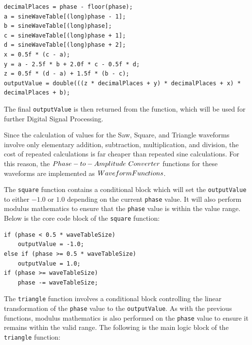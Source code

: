 \documentclass[a4paper,12pt]{report}
\begin{document}
 \noindent\begin{minipage}{\linewidth} \begin{lstlisting}[caption={4-Point Polynomial Interpolation implementation},label={code:4ptpolyinterpolation},captionpos=b]
decimalPlaces = phase - floor(phase);
a = sineWaveTable[(long)phase - 1];
b = sineWaveTable[(long)phase];
c = sineWaveTable[(long)phase + 1];
d = sineWaveTable[(long)phase + 2];
x = 0.5f * (c - a);
y = a - 2.5f * b + 2.0f * c - 0.5f * d;
z = 0.5f * (d - a) + 1.5f * (b - c);
outputValue = double(((z * decimalPlaces + y) * decimalPlaces + x) * decimalPlaces + b);
\end{lstlisting} \end{minipage}

The final \texttt{output\-Value} is then returned from the function, which will be used for further Digital Signal Processing.

Since the calculation of values for the Saw, Square, and Triangle waveforms involve only elementary addition, subtraction, multiplication, and division, the cost of repeated calculations is far cheaper than repeated sine calculations. For this reason, the $Phase-to-Amplitude\ \-Converter$ functions for these waveforms are implemented as $Waveform \-Functions$.

The \texttt{square} function contains a conditional block which will set the \texttt{output\-Value} to either $-1.0$ or $1.0$ depending on the current \texttt{phase} value. It will also perform modulus mathematics to ensure that the \texttt{phase} value is within the value range. Below is the core code block of the \texttt{square} function:

 \noindent\begin{minipage}{\linewidth} \begin{lstlisting}[caption={The \texttt{square()} waveform function},label={code:square},captionpos=b]
if (phase < 0.5 * waveTableSize)
    outputValue = -1.0;
else if (phase >= 0.5 * waveTableSize)
    outputValue = 1.0;
if (phase >= waveTableSize)
    phase -= waveTableSize;
\end{lstlisting} \end{minipage}

The \texttt{triangle} function involves a conditional block controlling the linear transformation of the \texttt{phase} value to the \texttt{output\-Value}.  As with the previous functions, modulus mathematics is also performed on the \texttt{phase} value to ensure it remains within the valid range. The following is the main logic block of the \texttt{triangle} function:
\end{document}
